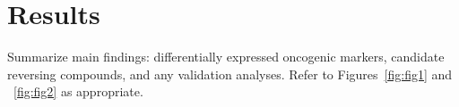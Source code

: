 \section*{Results}

Summarize main findings: differentially expressed oncogenic markers, candidate reversing compounds, and any validation analyses. Refer to Figures~\ref{fig:fig1} and ~\ref{fig:fig2} as appropriate.
